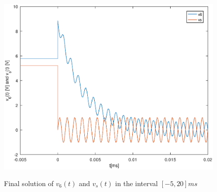 \begin{figure}[!ht] \centering
\caption{Final solution of $v_6(t)$ and $v_s(t)$ in the interval $[-5,20]ms$}
\includegraphics[width=0.8\linewidth]{theoretical_5.eps}
\label{fig:circuit}
\end{figure}







